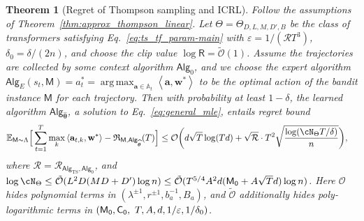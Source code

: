\documentclass[10pt]{article}
\newtheorem{theorem}{Theorem}
\newcommand{\eps}{\varepsilon}
\DeclareMathOperator*{\argmax}{arg\,max}
\renewcommand{\cO}{\mathcal{O}}
\newcommand{\<}{\left\langle}
\renewcommand{\>}{\right\rangle}
\newcommand{\E}{\mathbb{E}}
\newcommand{\inst}{{\mathsf{M}}}
\newcommand{\TS}{{\mathrm{TS}}}
\newcommand{\Tpspar}{{\lambda}}  %
\newcommand{\Tpsparn}{{r}} %
\newcommand{\tcO}{{\tilde{\mathcal O}}}
\newcommand{\state}{{s}}
\newcommand{\action}{{a}}
\newcommand{\totlen}{{T}} %
\newcommand{\sAlg}{{\mathsf{Alg}}}
\newcommand{\Numobs}{{n}}   %
\newcommand{\Parspace}{{\Theta}}
\newcommand{\esttfpar}{{\widehat{\btheta}}}
\newcommand{\prior}{{\Lambda}}
\newcommand{\shortexp}{{E}}
\newcommand{\layer}{{L}}
\newcommand{\hidden}{{D'}}
\newcommand{\head}{{M}}
\newcommand{\clipval}{{\mathsf{R}}}
\newcommand{\embd}{{D}}  %
\newcommand{\totreward}{{\mathfrak{R}}}  %
\newcommand{\distratio}{{\mathcal{R}}}
\newcommand{\Numact}{{A}}
\newcommand{\neuron}{{\mathsf{M_0}}}
\newcommand{\weightn}{{{\mathsf{C_0}}}}
\def\sA{{\mathbb{A}}}
\def\btheta{{\boldsymbol \theta}}
\def\ba{{\mathbf a}}
\def\bw{{\mathbf w}}
\newcommand{\authnote}[2]{{\scriptsize $\ll$\textsf{#1 notes: #2}$\gg$}}
\newcommand{\authnote}[2]{}
\newcommand{\lc}[1]{{\color{blue}\authnote{Licong}{#1}}}
\begin{document}
\begin{theorem}
[Regret of Thompson sampling and ICRL]\label{thm:ts_linear_regret}
Follow the assumptions of Theorem~\ref{thm:approx_thompson_linear}. Let $\Theta = \Theta_{D, L, M, \hidden, B}$ be the class of transformers satisfying Eq.~\eqref{eq:ts_tf_param-main} with $\eps=1/(\distratio\totlen^3)$,   $\delta_0=\delta/(2n)$, and choose the clip value $\log \clipval = \tcO(1)$. Assume the trajectories are collected by some context algorithm $\sAlg_0$, and we choose the expert algorithm $\sAlg_\shortexp(\state_t,\inst)=\action^*_t=\argmax_{\ba\in\sA_t}\<\ba,\bw^*\>$ to be the optimal action of the bandit instance $\inst$ for each trajectory. Then with probability at least $1-\delta$, the learned algorithm $\sAlg_{\esttfpar}$, a solution to Eq.~\eqref{eq:general_mle}, entails regret bound
\begin{align*}
\E_{\inst\sim\prior}\Big[\sum_{t=1}^\totlen\max_{k}\<\ba_{t,k},\bw^*\>-\totreward_{\inst,\sAlg_\esttfpar}(\totlen)\Big]&\leq \cO \bigg( d\sqrt{T}\log(Td)+ \sqrt{\distratio} \cdot\totlen^2\sqrt{\frac{\log ( \cN_{\Parspace} \totlen/\delta ) }{n} } \bigg), 
\end{align*}
where $\distratio = \distratio_{\sAlg_\TS,\sAlg_0}$, and $\log \cN_{\Parspace} \le \tcO(\layer^2\embd(\head\embd+\hidden)\log \Numobs )  \leq\tcO(\totlen^{5/4}\Numact^2 d(\neuron+\Numact\sqrt{\totlen}d)\log\Numobs)$. Here $\cO$ hides polynomial terms in $(\Tpspar^{\pm1}, \Tpsparn^{\pm1}, b_a^{-1}, B_a)$, and $\tcO$ additionally hides poly-logarithmic terms in   $(\neuron,\weightn,\\~ \totlen, \Numact, d, 1/\eps, 1/\delta_0)$. 
\end{theorem}

\end{document}
